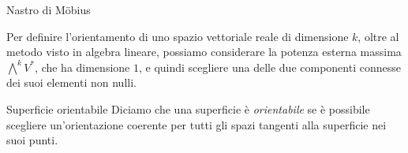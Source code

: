 \documentclass[a4paper]{article}
\begin{document}
\begin{radioactive}
\begin{snippetexample}{Nastro di Möbius}
\begin{center}
    \end{center}
\end{snippetexample}
\end{radioactive}

\begin{radioactive}
Per definire l'orientamento di uno spazio vettoriale reale di dimensione \(k\), oltre al metodo visto in algebra lineare,
possiamo considerare la potenza esterna massima \(\bigwedge^k V^*\), che ha dimensione \(1\), e quindi scegliere
una delle due componenti connesse dei suoi elementi non nulli.
\end{radioactive}

\begin{radioactive}
\begin{snippetdefinition}{Superficie orientabile}
    Diciamo che una superficie è \emph{orientabile} se è possibile scegliere
    un'orientazione coerente per tutti gli spazi tangenti alla superficie nei suoi punti.
\end{snippetdefinition}
\end{radioactive}
\end{document}
